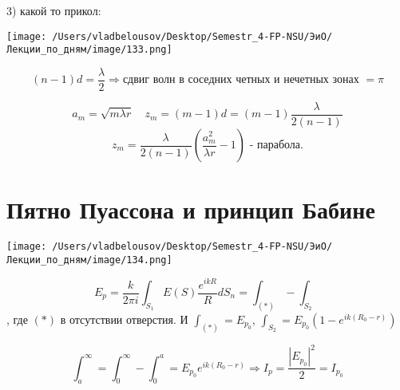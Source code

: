 \documentclass[12pt, a4paper]{report}
\begin{document}
3) какой то прикол: 

\begin{center}
    \texttt{[image: /Users/vladbelousov/Desktop/Semestr\_4-FP-NSU/ЭиО/Лекции\_по\_дням/image/133.png]}
\end{center}

\[ (n-1 ) d = \frac{\lambda}{2 } \Rightarrow \text{сдвиг волн в соседних четных и нечетных зонах }= \pi   \] 

\[ a_m = \sqrt{ m \lambda r} \quad  z_m = (m-1 ) d = (m-1 ) \frac{\lambda}{2 (n-1)}   \] 
\[ z_m = \frac{\lambda}{2(n-1)}\left( \frac{a_m ^2 }{ \lambda r }- 1  \right) \text{ - парабола.}   \] 

\section{Пятно Пуассона и принцип Бабине }

\begin{center}
    \texttt{[image: /Users/vladbelousov/Desktop/Semestr\_4-FP-NSU/ЭиО/Лекции\_по\_дням/image/134.png]}
\end{center}

\[ E_p = \frac{k}{2 \pi i } \int_{S_1} E(S) \frac{e^{i kR } }{R} d S_n = \int_{(*)}- \int_{S_2}   \] 
, где \( (*) \) в отсутствии отверстия. И \( \displaystyle \int_{(*)} = E_{p _0}   \), \( \displaystyle \int_{S_2} = E_{p _0} (1- e^{i k (R_0 -r)} )  \) 

\[ \int_{a }^{\infty  }= \int_{0 }^{\infty  }- \int_{0 }^{a} = E_{p_0} e^{ i k (R_0 -r)} \Rightarrow I_p = \frac{|E_{p_0} | ^2 }{2} = I_{p_0}       \] 

\ifdefined\mainfile
\else
    
\end{document}
